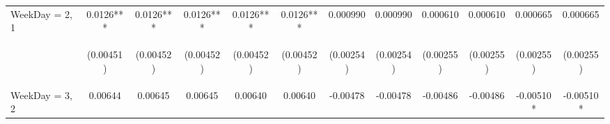 \documentclass[]{article}
\begin{document}
\begin{center}
\begin{tabular}{lccccccccccc}
WeekDay = 2, 1 & 0.0126*** & 0.0126*** & 0.0126*** & 0.0126*** & 0.0126*** & 0.000990 & 0.000990 & 0.000610 & 0.000610 & 0.000665 & 0.000665 \\
\vspace{4pt} & \begin{footnotesize}(0.00451)\end{footnotesize} & \begin{footnotesize}(0.00452)\end{footnotesize} & \begin{footnotesize}(0.00452)\end{footnotesize} & \begin{footnotesize}(0.00452)\end{footnotesize} & \begin{footnotesize}(0.00452)\end{footnotesize} & \begin{footnotesize}(0.00254)\end{footnotesize} & \begin{footnotesize}(0.00254)\end{footnotesize} & \begin{footnotesize}(0.00255)\end{footnotesize} & \begin{footnotesize}(0.00255)\end{footnotesize} & \begin{footnotesize}(0.00255)\end{footnotesize} & \begin{footnotesize}(0.00255)\end{footnotesize} \\
WeekDay = 3, 2 & 0.00644 & 0.00645 & 0.00645 & 0.00640 & 0.00640 & -0.00478 & -0.00478 & -0.00486 & -0.00486 & -0.00510* & -0.00510* \\

\end{tabular}
\end{center}
\end{document}
